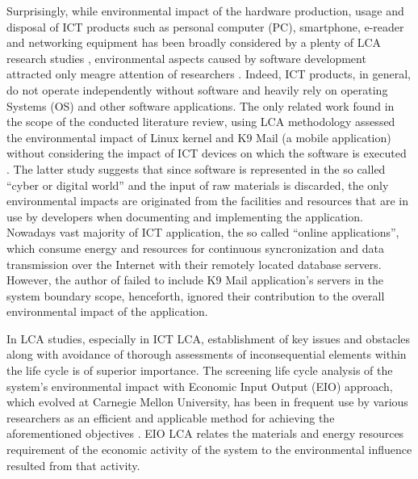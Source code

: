 \documentclass[conference]{IEEEtran}
\begin{document}
Surprisingly, while environmental impact of the hardware production, usage and disposal of ICT products such as personal computer (PC), smartphone, e-reader and networking equipment has been broadly considered by a plenty of LCA research studies \cite{guldbrandsson2012opportunities, Bull201410, farrant2012environmental, enroth2009,koljonen2008environmental}, environmental aspects caused by software development attracted only meagre attention of researchers \cite{Moshnyaga:2013}. Indeed, ICT products, in general, do not operate independently without software and heavily rely on operating Systems (OS) and other software applications. The only related work found in the scope of the conducted literature review, using LCA methodology assessed the environmental impact of Linux kernel and K9 Mail (a mobile application) without considering the impact of ICT devices on which the software is executed \cite{moshnyaga2013assessment,Moshnyaga:2013}. The latter study suggests that since software is represented in the so called ``cyber or digital world'' and the input of raw materials is discarded, the only environmental impacts are originated from the facilities and resources that are in use by developers when documenting and implementing the application. Nowadays vast majority of ICT application, the so called ``online applications'', which consume energy and resources for continuous syncronization and data transmission over the Internet with their remotely located database servers. However, the author of \cite{Moshnyaga:2013} failed to include K9 Mail application's servers in the system boundary scope, henceforth, ignored their contribution to the overall environmental impact of the application.

In LCA studies, especially in ICT LCA, establishment of key issues and obstacles along with avoidance of thorough assessments of inconsequential elements within the life cycle is of superior importance. The screening life cycle analysis of the system's environmental impact with Economic Input Output (EIO) approach, which evolved at Carnegie Mellon University, has been in frequent use by various researchers as an efficient and applicable method for achieving the aforementioned objectives \cite{1208069, junnila2008life, matthews2000extending}. EIO LCA relates the materials and energy resources requirement of the economic activity of the system to the environmental influence resulted from that activity.

\end{document}
